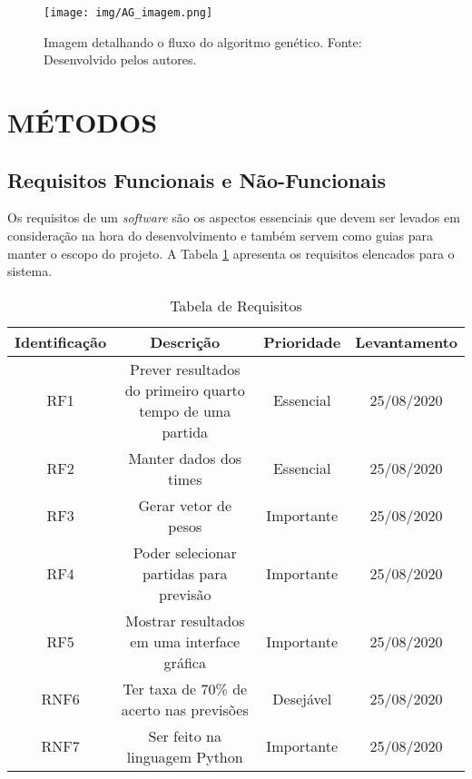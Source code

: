 \documentclass[brazilian]{ifsc-tcc}
\begin{document}
\begin{figure} [h]
    \centering
    \texttt{[image: img/AG\_imagem.png]}
    \caption{Imagem detalhando o fluxo do algoritmo genético. Fonte: Desenvolvido pelos autores.}
    \label{fig:AG_imagem}
\end{figure}


\section{MÉTODOS}

\subsection{Requisitos Funcionais e Não-Funcionais}

Os requisitos de um \textit{software} são os aspectos essenciais que devem ser levados em consideração na hora do desenvolvimento e também servem como guias para manter o escopo do projeto. A Tabela \ref{tab:requisitos} apresenta os requisitos elencados para o sistema.

\begin{table}[H]
\caption{Tabela de Requisitos}
\centering
\begin{tabular}{|c|c|c|c|}
\hline
Identificação & Descrição                                                  & Prioridade & Levantamento \\ \hline
RF1          & Prever resultados do primeiro quarto tempo de uma partida   & Essencial  & 25/08/2020   \\ \hline
RF2          & Manter dados dos times                                      & Essencial  & 25/08/2020   \\ \hline
RF3          & Gerar vetor de pesos                                        & Importante & 25/08/2020   \\ \hline
RF4          & Poder selecionar partidas para previsão                     & Importante & 25/08/2020   \\ \hline
RF5          & Mostrar resultados em uma interface gráfica                 & Importante & 25/08/2020   \\ \hline
RNF6         & Ter taxa de 70\% de acerto nas previsões                    & Desejável  & 25/08/2020   \\ \hline
RNF7         & Ser feito na linguagem Python                      & Importante & 25/08/2020   \\ \hline

\end{tabular}
\label{tab:requisitos}
\end{table}
\end{document}

